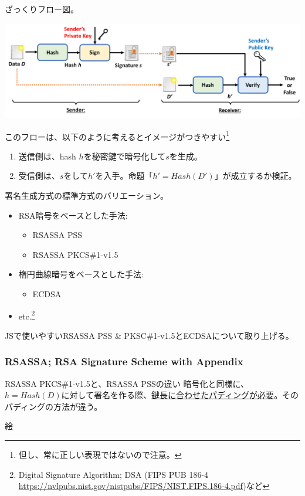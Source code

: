 \documentclass[12pt,dvipdfmx]{beamer}
\begin{document}
\begin{frame}
ざっくりフロー図。
\begin{center}
\includegraphics[width=0.9\linewidth]{Figs/sig-flow02.pdf}
\end{center}
このフローは、以下のように考えるとイメージがつきやすい\footnote[frame]{\scriptsize 但し、常に正しい表現ではないので注意。}
\begin{enumerate}
 \item 送信側は、hash $h$を\alert{秘密鍵で暗号化}して$s$を生成。
 \item 受信側は、$s$をして$h'$を入手。命題「$h' = \mathit{Hash}(D')$」が成立するか検証。
\end{enumerate}
\end{frame}

\begin{frame}
署名生成方式の標準方式のバリエーション。
\begin{itemize}
\item RSA暗号をベースとした手法:
\begin{itemize}
 \item RSASSA PSS
 \item RSASSA PKCS\#1-v1.5
\end{itemize}
\item 楕円曲線暗号をベースとした手法:
\begin{itemize}
 \item ECDSA
\end{itemize}
\item etc.\footnote[frame]{\scriptsize Digital Signature Algorithm; DSA (FIPS PUB 186-4 \url{https://nvlpubs.nist.gov/nistpubs/FIPS/NIST.FIPS.186-4.pdf})など}
\end{itemize}
JSで使いやすいRSASSA PSS \& PKSC\#1-v1.5とECDSAについて取り上げる。
\end{frame}


\begin{frame}
\frametitle{RSASSA; RSA Signature Scheme with Appendix}
\begin{block}{\scriptsize RSASSA PKCS\#1-v1.5と、RSASSA PSSの違い}
暗号化と同様に、$h=\mathit{Hash}(D)$に対して署名を作る際、\underline{鍵長に合わせたパディングが必要}。そのパディングの方法が違う。
\end{block}

\alert{絵}

\end{frame}
\end{document}
